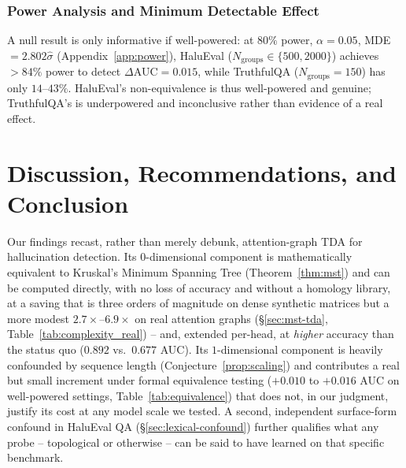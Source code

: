 \documentclass{article}
\begin{document}
\subsubsection{Power Analysis and Minimum Detectable Effect}
\label{sec:power}
A null result is only informative if well-powered: at $80\%$ power, $\alpha=0.05$, MDE$=2.802\hat\sigma$ (Appendix~\ref{app:power}), HaluEval ($N_{\text{groups}}\in\{500,2000\}$) achieves $>84\%$ power to detect $\Delta\text{AUC}=0.015$, while TruthfulQA ($N_{\text{groups}}=150$) has only $14$--$43\%$. HaluEval's non-equivalence is thus well-powered and genuine; TruthfulQA's is underpowered and inconclusive rather than evidence of a real effect.


\section{Discussion, Recommendations, and Conclusion}
\label{sec:discussion}
Our findings recast, rather than merely debunk, attention-graph TDA for hallucination detection. Its $0$-dimensional component is mathematically equivalent to Kruskal's Minimum Spanning Tree (Theorem~\ref{thm:mst}) and can be computed directly, with no loss of accuracy and without a homology library, at a saving that is three orders of magnitude on dense synthetic matrices but a more modest $2.7\times$--$6.9\times$ on real attention graphs (\S\ref{sec:mst-tda}, Table~\ref{tab:complexity_real}) -- and, extended per-head, at \emph{higher} accuracy than the status quo ($0.892$ vs.\ $0.677$ AUC). Its $1$-dimensional component is heavily confounded by sequence length (Conjecture~\ref{prop:scaling}) and contributes a real but small increment under formal equivalence testing ($+0.010$ to $+0.016$ AUC on well-powered settings, Table~\ref{tab:equivalence}) that does not, in our judgment, justify its cost at any model scale we tested. A second, independent surface-form confound in HaluEval QA (\S\ref{sec:lexical-confound}) further qualifies what any probe -- topological or otherwise -- can be said to have learned on that specific benchmark.
\end{document}
